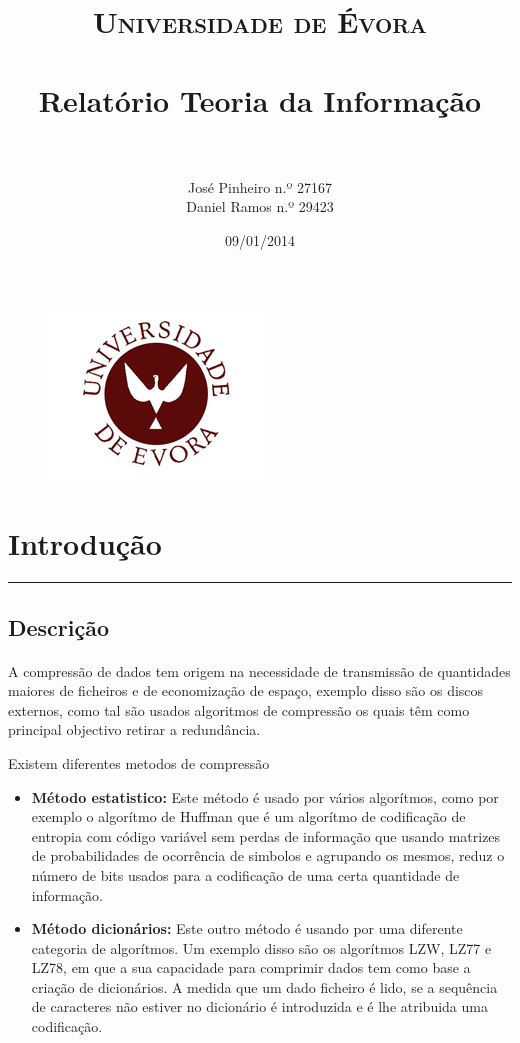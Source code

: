 \documentclass[paper=a4, fontsize=11pt]{scrartcl}
\title{
		\usefont{OT1}{bch}{b}{n}
		\normalfont \normalsize \textsc{Universidade de Évora} \\ [25pt]
		\horrule{0.5pt} \\[0.4cm]
		\huge Relatório Teoria da Informação \\
		\horrule{2pt} \\[0.5cm]
}
\author{
		\normalfont 								\normalsize
        José Pinheiro n.º 27167 \\ 
        \normalsize Daniel Ramos n.º 29423\\[-3pt]		\normalsize
        \date{09/01/2014}
}
\date{}
\numberwithin{equation}{section}		%
\numberwithin{figure}{section}			%
\numberwithin{table}{section}				%
\newcommand{\horrule}[1]{\rule{\linewidth}{#1}} 	%
\begin{document}
\maketitle

\begin{figure}[h!]
\centering
\includegraphics[scale=1.5]{ue.png}
\end{figure}
\FloatBarrier


\pagebreak
\newpage
\tableofcontents
\pagebreak
\newpage
\listoffigures
\pagebreak


\section{Introdução}
\horrule{2pt} 


\subsection{Descrição}
	
    \paragraph{} A compressão de dados tem origem na necessidade de transmissão de quantidades maiores de ficheiros e de economização de espaço, exemplo disso são os discos externos, como tal são usados algoritmos de compressão os quais têm como principal objectivo retirar a redundância.
    
    Existem diferentes metodos de compressão
    \begin{itemize}
 	 \item \textbf{Método estatistico:} Este método é usado por vários algorítmos, como por exemplo o algorítmo de Huffman que é um algorítmo de codificação de entropia com código variável sem perdas de informação  que usando matrizes de probabilidades de ocorrência de simbolos e agrupando os mesmos, reduz o número de bits usados para a codificação de uma certa quantidade de informação.
  	 \item \textbf{Método dicionários:} Este outro método é usando por uma diferente categoria de algorítmos. Um exemplo disso são os algorítmos LZW, LZ77 e LZ78, em que a sua capacidade para comprimir dados tem como base a criação de dicionários.
     A medida que um dado ficheiro é lido, se a sequência de caracteres não estiver no dicionário é introduzida e é lhe atribuida uma codificação.
  	\end{itemize}
\end{document}
